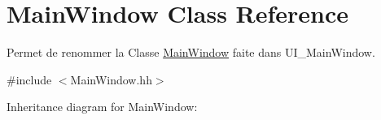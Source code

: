 \hypertarget{classMainWindow}{}\section{Main\+Window Class Reference}
\label{classMainWindow}


Permet de renommer la Classe \hyperlink{classMainWindow}{Main\+Window} faite dans U\+I\+\_\+\+Main\+Window.  




{\ttfamily \#include $<$Main\+Window.\+hh$>$}



Inheritance diagram for Main\+Window\+:
